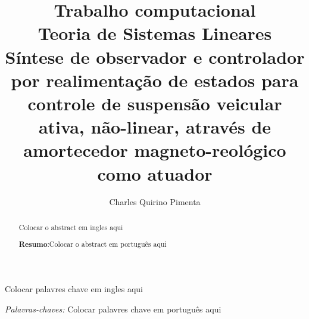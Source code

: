 \documentclass[a4paper]{ifacconf}
\begin{document}
	
	
    \begin{frontmatter}
        
        \title{Trabalho computacional \\Teoria de Sistemas Lineares \\Síntese de observador e controlador por realimentação de estados para controle de suspensão veicular ativa, não-linear, através de amortecedor magneto-reológico como atuador} 

        \author[First]{Charles Quirino Pimenta} 
        
        \address[First]{Programa de Pós-Graduação em Engenharia Elétrica - Universidade Federal de 
Minas Gerais - Av. Antônio Carlos 6627, 31270-901, Belo Horizonte, MG, Brasil\\ e-mail:charlesqp@ufmg.br.}
        
        \renewcommand{\abstractname}{{\bf Abstract:~}}
        \begin{abstract} Colocar o abstract em ingles aqui
        
        \vskip 1mm%
        {\noindent \bf Resumo}:Colocar o abstract em português aqui
        \end{abstract}
        
        
        \begin{keyword} Colocar palavres chave em ingles aqui 
        
        \vskip 1mm%
        {\noindent\it Palavras-chaves:} Colocar palavres chave em português aqui 
        \end{keyword}
        
        
        \end{frontmatter}
\end{document}
